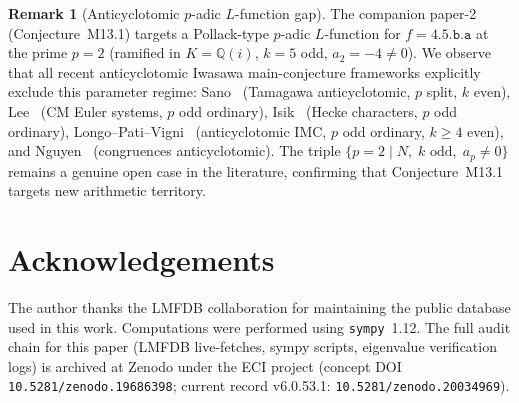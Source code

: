 \documentclass[12pt]{amsart}
\theoremstyle{definition}
\newtheorem{remark}[theorem]{Remark}
\newcommand{\Q}{\mathbb{Q}}
\begin{document}
\begin{remark}[Anticyclotomic $p$-adic $L$-function gap]\label{rem:anticycl}
The companion paper-2 (Conjecture~M13.1) targets a Pollack-type
$p$-adic $L$-function for $f = \mathtt{4.5.b.a}$ at the prime $p=2$
(ramified in $K=\Q(i)$, $k=5$ odd, $a_2 = -4 \ne 0$).
We observe that all recent anticyclotomic Iwasawa main-conjecture
frameworks explicitly exclude this parameter regime:
Sano~\cite{Sano2510} (Tamagawa anticyclotomic, $p$ split, $k$ even),
Lee~\cite{Lee2508} (CM Euler systems, $p$ odd ordinary),
Isik~\cite{Isik2412} (Hecke characters, $p$ odd ordinary),
Longo--Pati--Vigni~\cite{LPV2603} (anticyclotomic IMC, $p$ odd ordinary, $k \ge 4$ even),
and Nguyen~\cite{Nguyen2503} (congruences anticyclotomic).
The triple $\{p=2 \mid N,\; k \text{ odd},\; a_p \ne 0\}$ remains a
genuine open case in the literature, confirming that Conjecture~M13.1
targets new arithmetic territory.
\end{remark}


\section*{Acknowledgements}

The author thanks the LMFDB collaboration for maintaining the public
database used in this work.
Computations were performed using \texttt{sympy}~1.12.
The full audit chain for this paper (LMFDB live-fetches, sympy scripts,
eigenvalue verification logs) is archived at Zenodo under the
ECI project (concept DOI \texttt{10.5281/zenodo.19686398};
current record v6.0.53.1: \texttt{10.5281/zenodo.20034969}).

\end{document}
